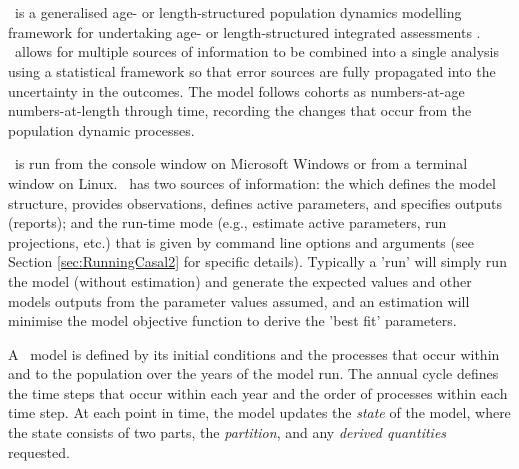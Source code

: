 \section{\label{sec:Overview}}

\CNAME\ is a generalised age- or length-structured population dynamics modelling framework for undertaking age- or length-structured integrated assessments \citep{Maunder_2013}. \CNAME\ allows for multiple sources of information to be combined into a single analysis using a statistical framework so that error sources are fully propagated into the uncertainty in the outcomes. The model follows cohorts as \ifAgeBased numbers-at-age \else numbers-at-length \fi through time, recording the changes that occur from the population dynamic processes.

\CNAME\ is run from the console window on Microsoft Windows or from a terminal window on Linux. \CNAME\ has two sources of information: the \emph{\config} which  defines the model structure, provides observations, defines active parameters, and specifies outputs (reports); and the run-time mode (e.g., estimate active parameters, run projections, etc.) that is given by command line options and arguments (see Section \ref{sec:RunningCasal2} for specific details). Typically a 'run' will simply run the model (without estimation) and generate the expected values and other models outputs from the parameter values assumed, and an estimation will minimise the model objective function to derive the 'best fit' parameters.

A \CNAME\ model is defined by its initial conditions and the processes that occur within and to the population over the years of the model run. The annual cycle defines the time steps that occur within each year and the order of processes within each time step. At each point in time, the model updates the \emph{state} of the model, where the state consists of two parts, the \emph{partition}, and any \emph{derived quantities} requested.

